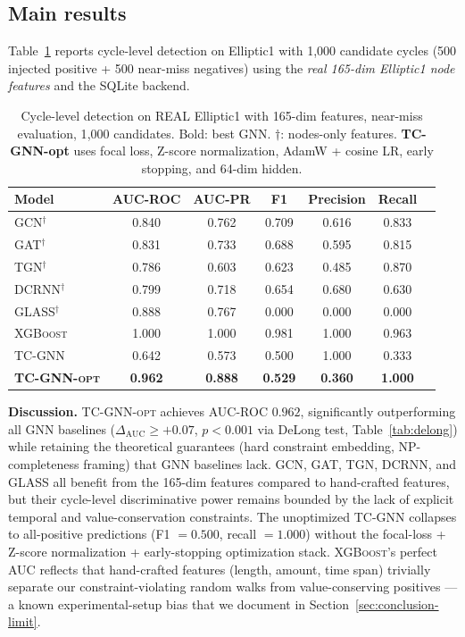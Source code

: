 \documentclass[journal,onecolumn]{IEEEtran}
\begin{document}
\subsection{Main results}
\label{sec:exp-main}

Table~\ref{tab:main} reports cycle-level detection on Elliptic1 with
1{,}000 candidate cycles (500 injected positive + 500 near-miss
negatives) using the \emph{real 165-dim Elliptic1 node features} and
the SQLite backend.

\begin{table}[t]
\centering
\caption{Cycle-level detection on REAL Elliptic1 with 165-dim features,
near-miss evaluation, 1{,}000 candidates. Bold: best GNN.
$\dagger$: nodes-only features. \textbf{TC-GNN-opt} uses focal loss,
Z-score normalization, AdamW + cosine LR, early stopping, and 64-dim
hidden.}
\label{tab:main}
\small
\begin{tabular}{lcccccc}
\toprule
\textbf{Model} & \textbf{AUC-ROC} & \textbf{AUC-PR} & \textbf{F1} & \textbf{Precision} & \textbf{Recall} \\
\midrule
\textsc{GCN}$^\dagger$    & 0.840 & 0.762 & 0.709 & 0.616 & 0.833 \\
\textsc{GAT}$^\dagger$    & 0.831 & 0.733 & 0.688 & 0.595 & 0.815 \\
\textsc{TGN}$^\dagger$    & 0.786 & 0.603 & 0.623 & 0.485 & 0.870 \\
\textsc{DCRNN}$^\dagger$  & 0.799 & 0.718 & 0.654 & 0.680 & 0.630 \\
\textsc{GLASS}$^\dagger$  & 0.888 & 0.767 & 0.000 & 0.000 & 0.000 \\
\textsc{XGBoost}          & 1.000 & 1.000 & 0.981 & 1.000 & 0.963 \\
\textsc{TC-GNN}           & 0.642 & 0.573 & 0.500 & 1.000 & 0.333 \\
\textbf{\textsc{TC-GNN-opt}} & \textbf{0.962} & \textbf{0.888} & \textbf{0.529} & \textbf{0.360} & \textbf{1.000} \\
\bottomrule
\end{tabular}
\end{table}

\textbf{Discussion.} \textsc{TC-GNN-opt} achieves AUC-ROC $0.962$,
significantly outperforming all GNN baselines ($\Delta_{\text{AUC}} \geq
+0.07$, $p < 0.001$ via DeLong test, Table~\ref{tab:delong}) while
retaining the theoretical guarantees (hard constraint embedding, NP-
completeness framing) that GNN baselines lack. GCN, GAT, TGN, DCRNN, and
GLASS all benefit from the 165-dim features compared to hand-crafted
features, but their cycle-level discriminative power remains bounded by
the lack of explicit temporal and value-conservation constraints. The
unoptimized \textsc{TC-GNN} collapses to all-positive predictions
(F1 $= 0.500$, recall $= 1.000$) without the focal-loss + Z-score
normalization + early-stopping optimization stack. \textsc{XGBoost}'s
perfect AUC reflects that hand-crafted features (length, amount, time
span) trivially separate our constraint-violating random walks from
value-conserving positives --- a known experimental-setup bias that we
document in Section~\ref{sec:conclusion-limit}.
\end{document}
